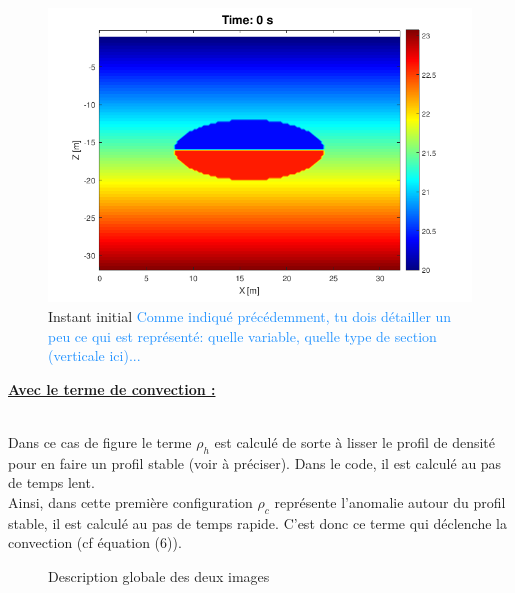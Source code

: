 \documentclass{rapportECC}
\newcommand{\FAadd}[1]{\textcolor{DodgerBlue}{{#1}}}                     %
\begin{document}
\begin{figure}[H]
    \centering
    \includegraphics[width=0.7
    \textwidth]{images/Int_ConvT0.png}
    \caption{Instant initial \FAadd{Comme indiqué précédemment, tu dois détailler un peu ce qui est représenté: quelle variable, quelle type de section (verticale ici)... }}
\end{figure}


\vspace{1 cm}
\underline{\textbf{Avec le terme de convection :}}
\vspace{0.5 cm}

\\
Dans ce cas de figure le terme $\rho_h$ est calculé de sorte à  lisser le profil de densité pour en faire un profil stable (voir \§ à préciser). Dans le code, il est calculé au pas de temps lent. \\
Ainsi, dans cette première configuration $\rho_c$ représente l'anomalie autour du profil stable, il est calculé au pas de temps rapide. C'est donc ce terme qui déclenche la convection (cf équation (6)). \\

\begin{figure}[htb]
    \centering
    \hfill
    \caption{Description globale des deux images}
    \label{fig:images_cote_a_cote}
\end{figure}
\end{document}
